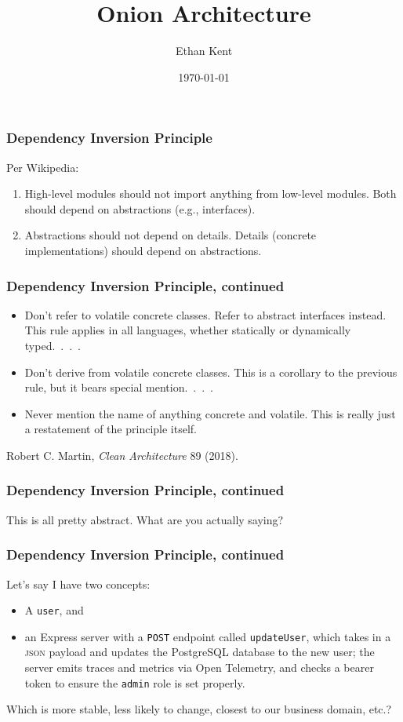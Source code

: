 \documentclass[aspectratio=169]{beamer}
\title{Onion Architecture}
\author{Ethan Kent}
\institute{Spoonflower}
\date{\today}
\begin{document}
\frame{\titlepage}

\begin{frame} %
  \frametitle{Dependency Inversion Principle}
  Per Wikipedia:

  \begin{enumerate}
    \item High-level modules should not import anything from low-level modules. Both should depend on abstractions (e.g., interfaces).
    \item Abstractions should not depend on details. Details (concrete implementations) should depend on abstractions.
  \end{enumerate}

\end{frame}

\begin{frame}
  \frametitle{Dependency Inversion Principle, continued}

  \begin{itemize}
    \item Don't refer to volatile concrete classes. Refer to abstract
          interfaces instead.  This rule applies in all languages, whether
          statically or dynamically typed.~.~.~.
    \item Don't derive from volatile concrete classes. This is a corollary to
          the previous rule, but it bears special mention.~.~.~.
    \item Never mention the name of anything concrete and volatile. This is
          really just a restatement of the principle itself.
  \end{itemize}
  \vspace{1em}

  Robert C. Martin, \textit{Clean Architecture} 89 (2018).
\end{frame}

\begin{frame}
  \frametitle{Dependency Inversion Principle, continued}

  This is all pretty abstract. What are you actually saying?
\end{frame}

\begin{frame}
  \frametitle{Dependency Inversion Principle, continued}

  Let's say I have two concepts:

  \begin{itemize}
    \item A \texttt{user}, and
    \item an Express server with a \texttt{POST} endpoint called
          \texttt{updateUser}, which takes in a \textsc{json} payload and
          updates the PostgreSQL database to the new user; the server emits
          traces and metrics via Open Telemetry, and checks a bearer token to
          ensure the \texttt{admin} role is set properly.
  \end{itemize}
  \vspace{1em}
  Which is more stable, less likely to change, closest to our business domain,
  etc.?
\end{frame}
\end{document}
